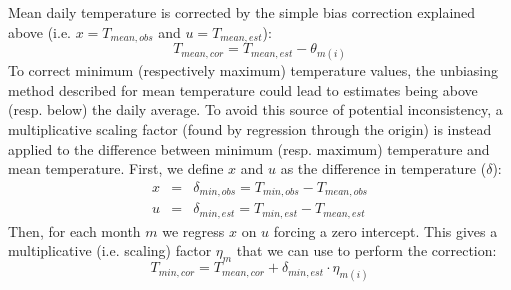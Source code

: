 \documentclass[11pt,a4paper]{article}
\begin{document}
Mean daily temperature is corrected by the simple bias correction explained above (i.e. $x = T_{mean, obs}$ and $u = T_{mean, est}$):
\begin{equation}
T_{mean, cor} = T_{mean, est} - \theta_{m(i)}
\end{equation}
To correct minimum (respectively maximum) temperature values, the unbiasing method described for mean temperature could lead to estimates being above (resp. below) the daily average. To avoid this source of potential inconsistency, a multiplicative scaling factor (found by regression through the origin) is instead applied to the difference between minimum (resp. maximum) temperature and mean temperature. First, we define $x$ and $u$ as the difference in temperature ($\delta$):
\begin{eqnarray}
x &=& \delta_{min, obs} = T_{min, obs} - T_{mean, obs}\\
u &=& \delta_{min, est} = T_{min, est} - T_{mean, est}
\end{eqnarray}
Then, for each month $m$ we regress $x$ on $u$ forcing a zero intercept. This gives a multiplicative (i.e. scaling) factor $\eta_{m}$ that we can use to perform the correction:
\begin{equation}
T_{min, cor} = T_{mean, cor} + \delta_{min, est} \cdot \eta_{m(i)}
\end{equation}
\end{document}
